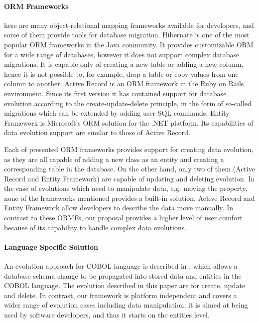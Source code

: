 \documentclass[11pt]{article}
\begin{document}
\paragraph{ORM Frameworks} here are many object-relational mapping frameworks available for developers, and some of them provide tools for database migration. Hibernate \cite{Hibernate} is one of the most popular ORM frameworks in the Java community.  It provides customizable ORM for a wide range of databases, however it does not support complex database migrations.  It is capable only of creating a new table or adding a new column, hence it is not possible to, for example, drop a table or copy values from one column to another. Active Record \cite{Active_Record} is an ORM framework in the Ruby on Rails environment. Since its first version it has contained support for database evolution according to the create-update-delete principle, in the form of so-called migrations \cite{Rails:Migrations} which can be extended by adding user SQL commands. Entity Framework \cite{Entity_Framework} is Microsoft's ORM solution for the .NET platform. Its capabilities of data evolution support are similar to those of Active Record. 

Each of presented ORM frameworks provides support for creating data evolution, as they are all capable of adding a new class as an entity and creating a corresponding table in the database. On the other hand, only two of them (Active Record and Entity Framework) are capable of updating and deleting evolution. In the case of evolutions which need to manipulate data, e.g. moving the property, none of the frameworks mentioned provides a built-in solution. Active Record and Entity Framework allow developers to describe the data move manually. In contrast to these ORMFs, our proposal  provides a higher level of user comfort because of its capability to handle complex data evolutions.


\paragraph{Language Specific Solution} An evolution approach for COBOL language is described in \cite{Cleve:2006ug}, which allows a database schema change to be propagated into stored data and entities in the COBOL language. The evolution described in this paper are for create, update and delete. In contrast, our framework is platform independent and covers a wider range of evolution cases including data manipulation; it is aimed at being used by software developers, and thus it starts on the entities level.
\end{document}
